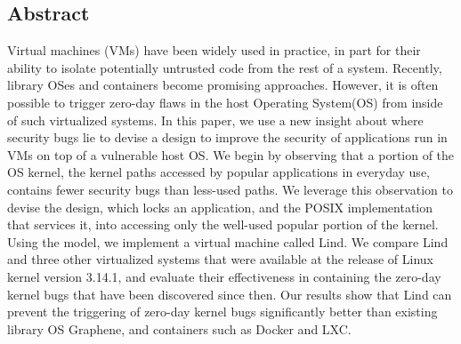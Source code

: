 \subsection*{Abstract}

Virtual machines (VMs) have been widely used in practice, in part for their ability to
isolate potentially untrusted code from the rest of a system. 
Recently, library OSes and containers become promising approaches.  
%
However, it is often possible to trigger zero-day flaws
in the host Operating System(OS) from inside of such virtualized systems. 
%
In this paper, we use a new insight about where security bugs lie to devise a design to improve the security of applications
run in VMs on top of a vulnerable host OS. 
We begin by observing that a portion of the OS kernel, the kernel paths accessed
by popular applications in everyday use, contains fewer security bugs than less-used paths. We
leverage this observation to devise the \lip design, which
locks an application, and the POSIX implementation that services it, into
accessing only the well-used popular portion of the kernel.  Using the \lip model, we
implement a virtual machine called Lind. 
%
We compare Lind and three other virtualized systems that were
available at the release of Linux kernel version 3.14.1, and evaluate
their effectiveness in containing the zero-day kernel bugs that have been discovered
since then.
%
Our results show that Lind can prevent the triggering of zero-day kernel bugs significantly better 
than existing library OS Graphene, and containers such as Docker and LXC. 